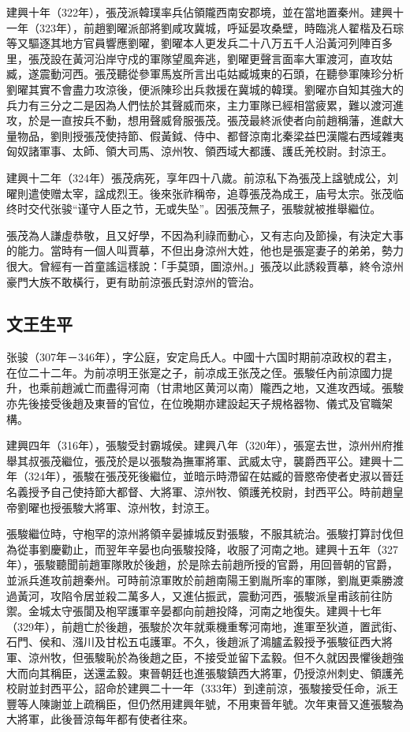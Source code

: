 建興十年（322年），張茂派韓璞率兵佔領隴西南安郡境，並在當地置秦州。建興十一年（323年），前趙劉曜派部將劉咸攻冀城，呼延晏攻桑壁，時臨洮人翟楷及石琮等又驅逐其地方官員響應劉曜，劉曜本人更发兵二十八万五千人沿黃河列陣百多里，張茂設在黃河沿岸守戍的軍隊望風奔逃，劉曜更聲言面率大軍渡河，直攻姑臧，遂震動河西。張茂聽從參軍馬岌所言出屯姑臧城東的石頭，在聽參軍陳珍分析劉曜其實不會盡力攻涼後，便派陳珍出兵救援在冀城的韓璞。劉曜亦自知其強大的兵力有三分之二是因為人們怯於其聲威而來，主力軍隊已經相當疲累，難以渡河進攻，於是一直按兵不動，想用聲威脅服張茂。張茂最終派使者向前趙稱藩，進獻大量物品，劉則授張茂使持節、假黃鉞、侍中、都督涼南北秦梁益巴漢隴右西域雜夷匈奴諸軍事、太師、領大司馬、涼州牧、領西域大都護、護氐羌校尉。封涼王。

建興十二年（324年）張茂病死，享年四十八歲。前涼私下為張茂上諡號成公，刘曜則遣使赠太宰，諡成烈王。後來张祚稱帝，追尊張茂為成王，庙号太宗。张茂临终时交代张骏“谨守人臣之节，无或失坠”。因張茂無子，張駿就被推舉繼位。

張茂為人謙虛恭敬，且又好學，不因為利祿而動心，又有志向及節操，有決定大事的能力。當時有一個人叫賈摹，不但出身涼州大姓，他也是張寔妻子的弟弟，勢力很大。曾經有一首童謠這樣說：「手莫頭，圖涼州。」張茂以此誘殺賈摹，終令涼州豪門大族不敢橫行，更有助前涼張氏對涼州的管治。


\subsection{文王生平}

张骏（307年－346年），字公庭，安定烏氏人。中國十六国时期前凉政权的君主，在位二十二年。为前凉明王张寔之子，前凉成王张茂之侄。張駿任內前涼國力提升，也乘前趙滅亡而盡得河南（甘肃地区黄河以南）隴西之地，又進攻西域。張駿亦先後接受後趙及東晉的官位，在位晚期亦建設起天子規格器物、儀式及官職架構。

建興四年（316年），張駿受封霸城侯。建興八年（320年），張寔去世，涼州州府推舉其叔張茂繼位，張茂於是以張駿為撫軍將軍、武威太守，襲爵西平公。建興十二年（324年），張駿在張茂死後繼位，並暗示時滯留在姑臧的晉愍帝使者史淑以晉廷名義授予自己使持節大都督、大將軍、涼州牧、領護羌校尉，封西平公。時前趙皇帝劉曜也授張駿大將軍、涼州牧，封涼王。

張駿繼位時，守枹罕的涼州將領辛晏據城反對張駿，不服其統治。張駿打算討伐但為從事劉慶勸止，而翌年辛晏也向張駿投降，收服了河南之地。建興十五年（327年），張駿聽聞前趙軍隊敗於後趙，於是除去前趙所授的官爵，用回晉朝的官爵，並派兵進攻前趙秦州。可時前涼軍敗於前趙南陽王劉胤所率的軍隊，劉胤更乘勝渡過黃河，攻陷令居並殺二萬多人，又進佔振武，震動河西，張駿派皇甫該前往防禦。金城太守張閬及枹罕護軍辛晏都向前趙投降，河南之地復失。建興十七年（329年），前趙亡於後趙，張駿於次年就乘機重奪河南地，進軍至狄道，置武街、石門、侯和、漒川及甘松五屯護軍。不久，後趙派了鴻臚孟毅授予張駿征西大將軍、涼州牧，但張駿恥於為後趙之臣，不接受並留下孟毅。但不久就因畏懼後趙強大而向其稱臣，送還孟毅。東晉朝廷也進張駿鎮西大將軍，仍授涼州刺史、領護羌校尉並封西平公，詔命於建興二十一年（333年）到達前涼，張駿接受任命，派王豐等人陳謝並上疏稱臣，但仍然用建興年號，不用東晉年號。次年東晉又進張駿為大將軍，此後晉涼每年都有使者往來。

